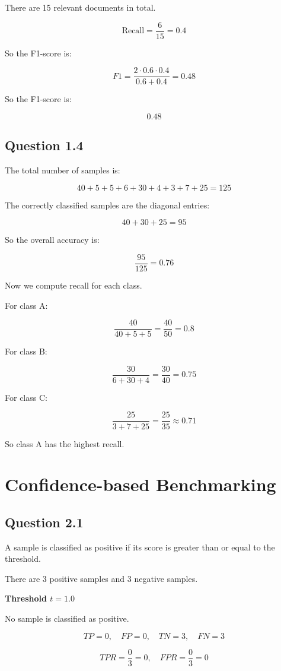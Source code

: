 \documentclass[paper=a4, fontsize=11pt]{scrartcl}
\begin{document}
There are 15 relevant documents in total.

\[
\text{Recall} = \frac{6}{15} = 0.4
\]

So the F1-score is:

\[
F1 = \frac{2 \cdot 0.6 \cdot 0.4}{0.6 + 0.4} = 0.48
\]

So the F1-score is:

\[
0.48
\]

\subsection*{Question 1.4}
The total number of samples is:

\[
40+5+5+6+30+4+3+7+25 = 125
\]

The correctly classified samples are the diagonal entries:

\[
40+30+25 = 95
\]

So the overall accuracy is:

\[
\frac{95}{125} = 0.76
\]

Now we compute recall for each class.

For class A:

\[
\frac{40}{40+5+5} = \frac{40}{50} = 0.8
\]

For class B:

\[
\frac{30}{6+30+4} = \frac{30}{40} = 0.75
\]

For class C:

\[
\frac{25}{3+7+25} = \frac{25}{35} \approx 0.71
\]

So class A has the highest recall.

\section{Confidence-based Benchmarking}

\subsection*{Question 2.1}
A sample is classified as positive if its score is greater than or equal to the threshold.

There are 3 positive samples and 3 negative samples.

\textbf{Threshold $t=1.0$}

No sample is classified as positive.

\[
TP=0,\quad FP=0,\quad TN=3,\quad FN=3
\]

\[
TPR=\frac{0}{3}=0,\quad FPR=\frac{0}{3}=0
\]
\end{document}
